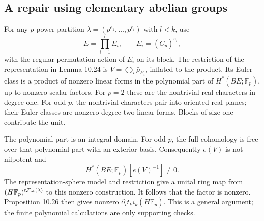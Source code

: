 \documentclass[10pt]{article}
\begin{document}
\subsection*{A repair using elementary abelian groups}
For any \(p\)-power partition \(\lambda=(p^{e_1},\ldots,p^{e_l})\) with \(l<k\), use \[E=\prod_{i=1}^l E_i,\qquad E_i=(C_p)^{e_i},\] with the regular permutation action of \(E_i\) on its block. The restriction of the representation in Lemma 10.24 is \(V=\bigoplus_i\bar\rho_{E_i}\), inflated to the product. Its Euler class is a product of nonzero linear forms in the polynomial part of \(H^*(BE;\mathbb F_p)\), up to nonzero scalar factors. For \(p=2\) these are the nontrivial real characters in degree one. For odd \(p\), the nontrivial characters pair into oriented real planes; their Euler classes are nonzero degree-two linear forms. Blocks of size one contribute the unit.\par
The polynomial part is an integral domain. For odd \(p\), the full cohomology is free over that polynomial part with an exterior basis. Consequently \(e(V)\) is not nilpotent and \[H^*(BE;\mathbb F_p)[e(V)^{-1}]\ne0.\] The representation-sphere model and restriction give a unital ring map from \((H\mathbb F_p)^{t\mathcal F_{\rm nt}(\lambda)}\) to this nonzero construction. It follows that the factor is nonzero. Proposition 10.26 then gives nonzero \(\partial_l t_k i_k(H\mathbb F_p)\). This is a general argument; the finite polynomial calculations are only supporting checks.\par
\end{document}
